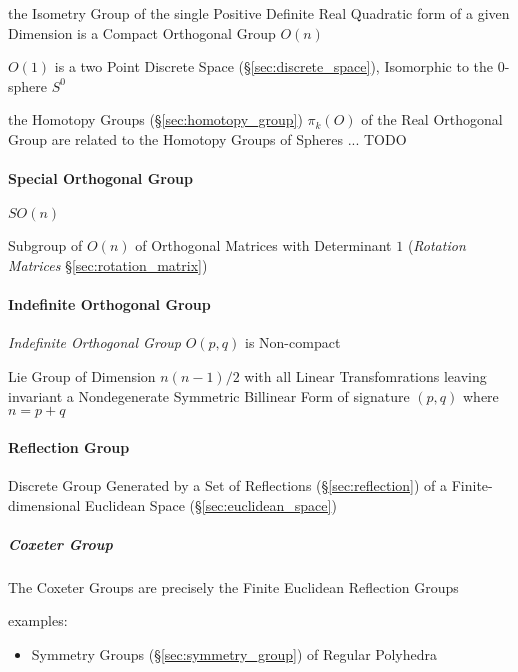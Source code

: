 the Isometry Group of the single Positive Definite Real Quadratic form of a
given Dimension is a Compact Orthogonal Group $O(n)$

$O(1)$ is a two Point Discrete Space (\S\ref{sec:discrete_space}), Isomorphic
to the $0$-sphere $S^0$

the Homotopy Groups (\S\ref{sec:homotopy_group}) $\pi_k(O)$ of the Real
Orthogonal Group are related to the Homotopy Groups of Spheres
... TODO



\paragraph{Special Orthogonal Group}\label{sec:special_orthogonal_group}\hfill

$SO(n)$

Subgroup of $O(n)$ of Orthogonal Matrices with Determinant $1$ (\emph{Rotation
  Matrices} \S\ref{sec:rotation_matrix})



\paragraph{Indefinite Orthogonal Group}
\label{sec:indefinite_orthogonal_group}\hfill

\emph{Indefinite Orthogonal Group} $O(p,q)$ is Non-compact

Lie Group of Dimension $n(n-1)/2$ with all Linear Transfomrations leaving
invariant a Nondegenerate Symmetric Billinear Form of signature $(p,q)$ where
$n = p+q$



\paragraph{Reflection Group}\label{sec:reflection_group}\hfill

Discrete Group Generated by a Set of Reflections (\S\ref{sec:reflection}) of a
Finite-dimensional Euclidean Space (\S\ref{sec:euclidean_space})



\subparagraph{Coxeter Group}\label{sec:coxeter_group}\hfill

The Coxeter Groups are precisely the Finite Euclidean Reflection Groups

examples:
\begin{itemize}
  \item Symmetry Groups (\S\ref{sec:symmetry_group}) of Regular Polyhedra
\end{itemize}




